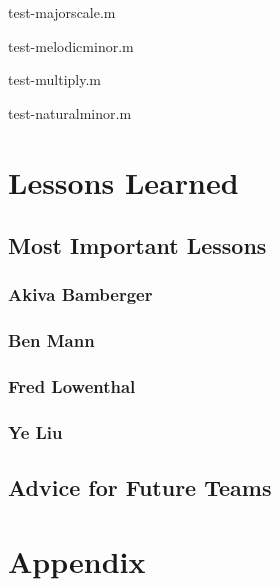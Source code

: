 \documentclass[12pt,A4]{book}
\begin{document}
	test-majorscale.m
	
	test-melodicminor.m
	
	test-multiply.m
	
	test-naturalminor.m

\chapter{Lessons Learned}
\section{Most Important Lessons}
\subsection{Akiva Bamberger}
\subsection{Ben Mann}
\subsection{Fred Lowenthal}
\subsection{Ye Liu}
\section{Advice for Future Teams}
\chapter{Appendix}
\end{document}
